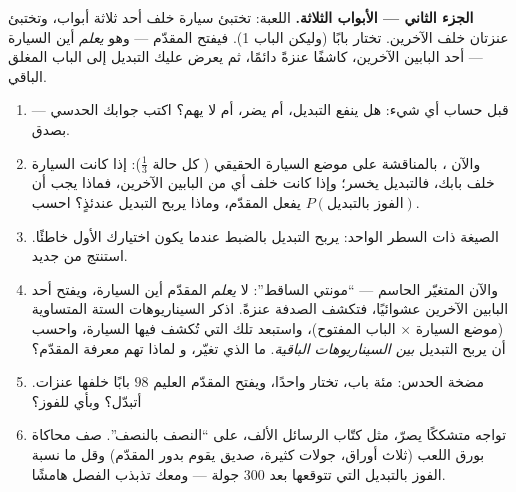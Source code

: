 \begin{problem}
\medskip
\noindent\textbf{الجزء الثاني --- الأبواب الثلاثة.}
اللعبة: تختبئ سيارة خلف أحد ثلاثة أبواب، وتختبئ عنزتان خلف
الآخرين. تختار بابًا (وليكن الباب 1). فيفتح المقدّم --- وهو
\emph{يعلم} أين السيارة --- أحد البابين الآخرين، كاشفًا عنزةً
دائمًا، ثم يعرض عليك التبديل
إلى الباب المغلق الباقي.
\begin{enumerate}[resume]
  \item قبل حساب أي شيء: هل ينفع التبديل، أم يضر، أم
        لا يهم؟ اكتب جوابك الحدسي --- بصدق.
  \item والآن ، بالمناقشة على موضع السيارة الحقيقي
        ( كل حالة $\frac13$): إذا كانت السيارة خلف بابك،
        فالتبديل يخسر؛ وإذا كانت خلف أي من البابين الآخرين، فماذا
        يجب أن يفعل المقدّم، وماذا يربح التبديل عندئذٍ؟
        احسب $P(\text{الفوز بالتبديل})$.
  \item الصيغة ذات السطر الواحد: يربح التبديل بالضبط عندما يكون
        اختيارك الأول خاطئًا. استنتج من جديد.
  \item والآن المتغيّر الحاسم --- ``مونتي الساقط'': لا
        \emph{يعلم} المقدّم أين السيارة، ويفتح أحد
        البابين الآخرين عشوائيًا، فتكشف الصدفة عنزةً. اذكر
        السيناريوهات الستة المتساوية  (موضع السيارة $\times$
        الباب المفتوح)، واستبعد تلك التي تُكشف فيها السيارة،
        واحسب  أن يربح التبديل
        \emph{بين السيناريوهات الباقية}. ما الذي تغيّر، و
        لماذا تهم معرفة المقدّم؟
  \item مضخة الحدس: مئة باب، تختار واحدًا، ويفتح
        المقدّم العليم $98$ بابًا خلفها عنزات. أتبدّل؟ وبأي
         للفوز؟
  \item تواجه متشككًا يصرّ، مثل كتّاب الرسائل الألف،
        على ``النصف بالنصف''. صف محاكاة بورق اللعب
        (ثلاث أوراق، جولات كثيرة، صديق يقوم بدور المقدّم) وقل
        ما نسبة الفوز بالتبديل التي تتوقعها بعد $300$
        جولة --- ومعك  تذبذب الفصل
        هامشًا.
\end{enumerate}


\end{problem}
